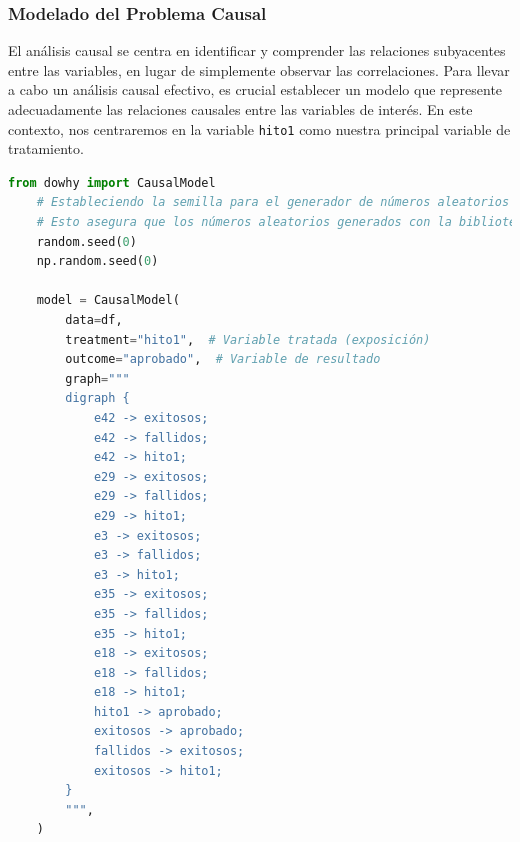\subsubsection{Modelado del Problema Causal}

El análisis causal se centra en identificar y comprender las relaciones subyacentes entre las variables, en lugar de simplemente observar las correlaciones. Para llevar a cabo un análisis causal efectivo, es crucial establecer un modelo que represente adecuadamente las relaciones causales entre las variables de interés. En este contexto, nos centraremos en la variable \texttt{hito1} como nuestra principal variable de tratamiento.

\begin{lstlisting}[language=Python, caption=Construcción del Modelo Causal para hito1, label=lst:model_causalHito1]
    from dowhy import CausalModel
    # Estableciendo la semilla para el generador de números aleatorios de la biblioteca 'random' en Python.
    # Esto asegura que los números aleatorios generados con la biblioteca 'random' serán reproducibles en cada ejecución.
    random.seed(0)
    np.random.seed(0)
    
    model = CausalModel(
        data=df,
        treatment="hito1",  # Variable tratada (exposición)
        outcome="aprobado",  # Variable de resultado
        graph="""
        digraph {
            e42 -> exitosos;
            e42 -> fallidos;
            e42 -> hito1;
            e29 -> exitosos;
            e29 -> fallidos;
            e29 -> hito1;
            e3 -> exitosos;
            e3 -> fallidos;
            e3 -> hito1;
            e35 -> exitosos;
            e35 -> fallidos;
            e35 -> hito1;
            e18 -> exitosos;
            e18 -> fallidos;
            e18 -> hito1;
            hito1 -> aprobado;
            exitosos -> aprobado;
            fallidos -> exitosos;
            exitosos -> hito1;
        }
        """,
    )
            \end{lstlisting}


